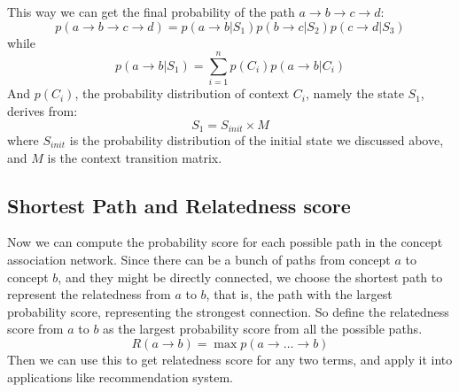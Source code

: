 This way we can get the final probability of the path $a\rightarrow b\rightarrow c\rightarrow d$:
\begin{equation}
p(a\rightarrow b\rightarrow c\rightarrow d)=p(a\rightarrow b|S_1)p(b\rightarrow c|S_2)p(c\rightarrow d|S_3)
\end{equation}
while
\begin{equation}
p(a\rightarrow b|S_1)=\sum_{i=1}^np(C_i)p(a\rightarrow b|C_i)
\end{equation}
And $p(C_i)$, the probability distribution of context $C_i$, namely the
state $S_1$, derives from:
\begin{equation}
S_1=S_{init}\times M
\end{equation}
where $S_{init}$ is the probability distribution of the initial state we discussed above,
and $M$ is the context transition matrix.

\subsection{Shortest Path and Relatedness score}
Now we can compute the probability score for each possible path
in the concept association network. Since there can be a bunch of
paths from concept $a$ to concept $b$, and they might be directly connected,
we choose the shortest path
to represent the relatedness from $a$ to $b$, that is, the path with
the largest probability score, representing the strongest connection.
So define the relatedness score from $a$ to $b$ as the largest probability
score from all the possible paths.
\begin{equation}
R(a\rightarrow b)=\max{p(a\rightarrow \ldots \rightarrow b)}
\end{equation}
Then we can use this to get relatedness score for any two terms, and apply it
into applications like recommendation system.

